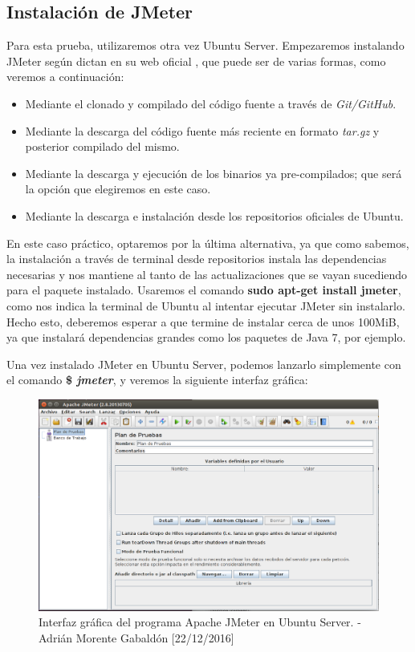 	\subsection{Instalación de JMeter}
	Para esta prueba, utilizaremos otra vez Ubuntu Server. Empezaremos instalando JMeter según dictan en su web oficial \cite{jmeter-install}, que puede ser de varias formas, como veremos a continuación:
	\begin{itemize}
		\item Mediante el clonado y compilado del código fuente a través de \emph{Git/GitHub}.
		\item Mediante la descarga del código fuente más reciente en formato \emph{tar.gz} y posterior compilado del mismo.
		\item Mediante la descarga y ejecución de los binarios ya pre-compilados; que será la opción que elegiremos en este caso.
		\item Mediante la descarga e instalación desde los repositorios oficiales de Ubuntu.
	\end{itemize}
	En este caso práctico, optaremos por la última alternativa, ya que como sabemos, la instalación a través de terminal desde repositorios instala las dependencias necesarias y nos mantiene al tanto de las actualizaciones que se vayan sucediendo para el paquete instalado. Usaremos el comando \textbf{sudo apt-get install jmeter}, como nos indica la terminal de Ubuntu al intentar ejecutar JMeter sin instalarlo. Hecho esto, deberemos esperar a que termine de instalar cerca de unos 100MiB, ya que instalará dependencias grandes como los paquetes de Java 7, por ejemplo.
		
	Una vez instalado JMeter en Ubuntu Server, podemos lanzarlo simplemente con el comando \textbf{\$ \textit{jmeter}}, y veremos la siguiente interfaz gráfica:
	\begin{figure}[H]
		\centering
		\includegraphics[scale=0.4]{jmeter-interface}
		\caption{Interfaz gráfica del programa Apache JMeter en Ubuntu Server. - Adrián Morente Gabaldón [22/12/2016]}
		\label{figura5}
	\end{figure}
	
